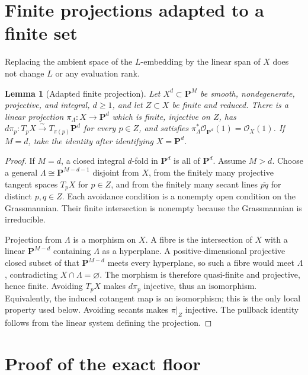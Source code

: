 \documentclass[11pt]{article}
\newtheorem{lemma}[theorem]{Lemma}
\newcommand{\PP}{\mathbf P}
\newcommand{\cO}{\mathcal O}
\begin{document}
\section{Finite projections adapted to a finite set}\label{sec:projection}

Replacing the ambient space of the $L$-embedding by the linear span of $X$
does not change $L$ or any evaluation rank.

\begin{lemma}[Adapted finite projection]\label{lem:projection}
Let $X^d\subset\PP^M$ be smooth, nondegenerate, projective, and integral,
$d\geq1$, and let $Z\subset X$ be finite and reduced.  There is a linear
projection $\pi_\Lambda:X\to\PP^d$ which is finite, injective on $Z$, has
$d\pi_p:T_pX\xrightarrow{\sim}T_{\pi(p)}\PP^d$ for every $p\in Z$, and satisfies
$\pi_\Lambda^*\cO_{\PP^d}(1)=\cO_X(1)$.  If $M=d$, take the identity after
identifying $X=\PP^d$.
\end{lemma}

\begin{proof}
If $M=d$, a closed integral $d$-fold in $\PP^d$ is all of $\PP^d$.
Assume $M>d$.  Choose a general
$\Lambda\cong\PP^{M-d-1}$ disjoint from $X$, from the finitely many
projective tangent spaces $T_pX$ for $p\in Z$, and from the finitely many
secant lines $\overline{pq}$ for distinct $p,q\in Z$.  Each avoidance
condition is a nonempty open condition on the Grassmannian.  Their finite
intersection is nonempty because the Grassmannian is irreducible.

Projection from $\Lambda$ is a morphism on $X$.  A fibre is the intersection
of $X$ with a linear $\PP^{M-d}$ containing $\Lambda$ as a hyperplane.  A
positive-dimensional projective closed subset of that $\PP^{M-d}$ meets
every hyperplane, so such a fibre would meet $\Lambda$, contradicting
$X\cap\Lambda=\varnothing$.  The morphism is therefore quasi-finite and
projective, hence finite.  Avoiding $T_pX$ makes $d\pi_p$ injective, thus an
isomorphism.  Equivalently, the induced cotangent map is an isomorphism; this
is the only local property used below.  Avoiding secants makes $\pi|_Z$
injective.  The pullback identity follows
from the linear system defining the projection.
\end{proof}

\section{Proof of the exact floor}\label{sec:exact-proof}
\end{document}
